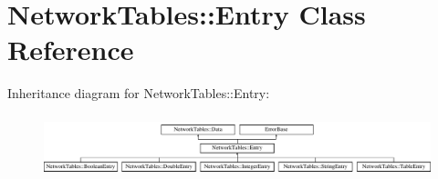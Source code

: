 \hypertarget{classNetworkTables_1_1Entry}{
\section{NetworkTables::Entry Class Reference}
\label{classNetworkTables_1_1Entry}
}
Inheritance diagram for NetworkTables::Entry:\begin{figure}[H]
\begin{center}
\leavevmode
\includegraphics[height=1.816216cm]{classNetworkTables_1_1Entry}
\end{center}
\end{figure}
